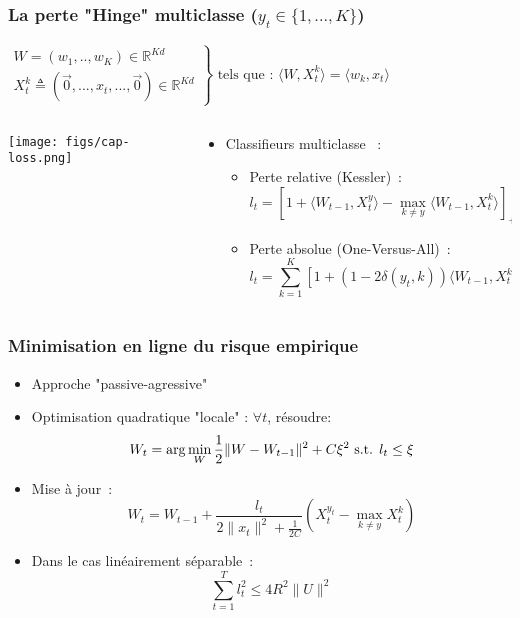 \documentclass{beamer}
\begin{document}
\begin{frame}
	\frametitle{La perte "Hinge" multiclasse ($y_t \in \{1,...,K\}$)}
		\begin{exampleblock}{}
			$
			\left.
			\begin{array}{l}
			W = (w_1,..,w_K) \in \mathbb{R}^{K d}\\
			X_t^k \triangleq (\vec{0}, ...,  x_t, ..., \vec{0}) \in \mathbb{R}^{K d}
			\end{array}
			\right\}
			\text{ tels que : }
			\langle W, X^k_t\rangle = \langle w_k, x_t\rangle
			$
			
		\end{exampleblock}
		
	\begin{columns}
		\begin{column}{.2 \linewidth}
			\centerline{\texttt{[image: figs/cap-loss.png]}}
		\end{column}
		\begin{column}{.8 \linewidth}
			\begin{itemize}
				\item Classifieurs multiclasse ~:
				\begin{itemize}
					\item Perte relative (Kessler)~:
					$$l_t =  \left[ 1 +  \langle W_{t-1}, X_t^y \rangle - \max_{k \neq y} \langle W_{t-1}, X_t^k\rangle\right]_+$$
					\item Perte absolue (One-Versus-All)~:
					$$l_t = \sum_{k=1}^K \left[1 + (1 - 2 \delta(y_t,k)) \langle W_{t-1}, X_t^k\rangle\right]_+$$
					
				\end{itemize}
			\end{itemize}
		\end{column}		
	\end{columns}
\end{frame}

\begin{frame}\frametitle{Minimisation en ligne du risque empirique}
	\begin{itemize}
		\item Approche "passive-agressive" \cite{crammer2006online}
		\item Optimisation quadratique "locale" : $\forall t$, résoudre: 
		$$W_{t} = \arg \min_W \frac{1}{2} \| W - W_{t-1}\|^2 + C \xi^2 \hbox{ s.t. } l_t \leq \xi$$
		\item Mise à jour~:
		$$W_{t} =  W_{t-1} + \frac{l_t}{2\|x_t\|^2 + \frac{1}{2C}}  (X_t^{y_t} - \max_{k \neq y} X_t^k)$$
		\item Dans le cas linéairement séparable~:
		$$\sum_{t=1}^{T} l_t^2 \leqslant 4 R^2 \parallel{U}\parallel^2$$
	\end{itemize}
\end{frame}
\end{document}
